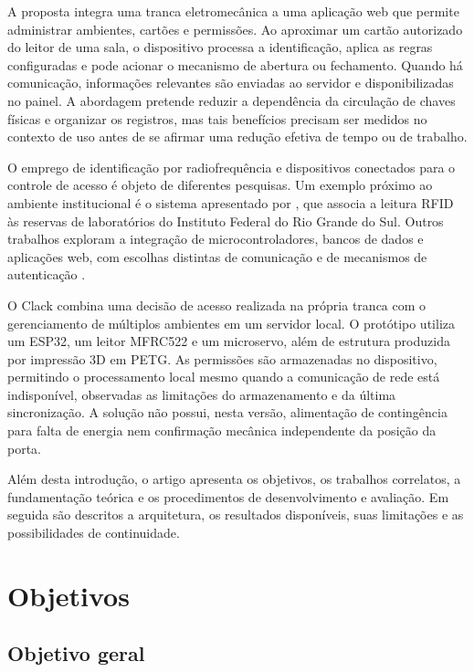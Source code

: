 \documentclass[12pt]{article}
\begin{document}
A proposta integra uma tranca eletromecânica a uma aplicação web que permite administrar ambientes, cartões e permissões. Ao aproximar um cartão autorizado do leitor de uma sala, o dispositivo processa a identificação, aplica as regras configuradas e pode acionar o mecanismo de abertura ou fechamento. Quando há comunicação, informações relevantes são enviadas ao servidor e disponibilizadas no painel. A abordagem pretende reduzir a dependência da circulação de chaves físicas e organizar os registros, mas tais benefícios precisam ser medidos no contexto de uso antes de se afirmar uma redução efetiva de tempo ou de trabalho.

O emprego de identificação por radiofrequência e dispositivos conectados para o controle de acesso é objeto de diferentes pesquisas. Um exemplo próximo ao ambiente institucional é o sistema apresentado por \cite{alves2022reservas}, que associa a leitura RFID às reservas de laboratórios do Instituto Federal do Rio Grande do Sul. Outros trabalhos exploram a integração de microcontroladores, bancos de dados e aplicações web, com escolhas distintas de comunicação e de mecanismos de autenticação \cite{goncalves2019rfidweb,costa2020esp32rfid,lima2025trancadura}.

O Clack combina uma decisão de acesso realizada na própria tranca com o gerenciamento de múltiplos ambientes em um servidor local. O protótipo utiliza um ESP32, um leitor MFRC522 e um microservo, além de estrutura produzida por impressão 3D em PETG. As permissões são armazenadas no dispositivo, permitindo o processamento local mesmo quando a comunicação de rede está indisponível, observadas as limitações do armazenamento e da última sincronização. A solução não possui, nesta versão, alimentação de contingência para falta de energia nem confirmação mecânica independente da posição da porta.

Além desta introdução, o artigo apresenta os objetivos, os trabalhos correlatos, a fundamentação teórica e os procedimentos de desenvolvimento e avaliação. Em seguida são descritos a arquitetura, os resultados disponíveis, suas limitações e as possibilidades de continuidade.

\section{Objetivos}

\subsection{Objetivo geral}
\end{document}
